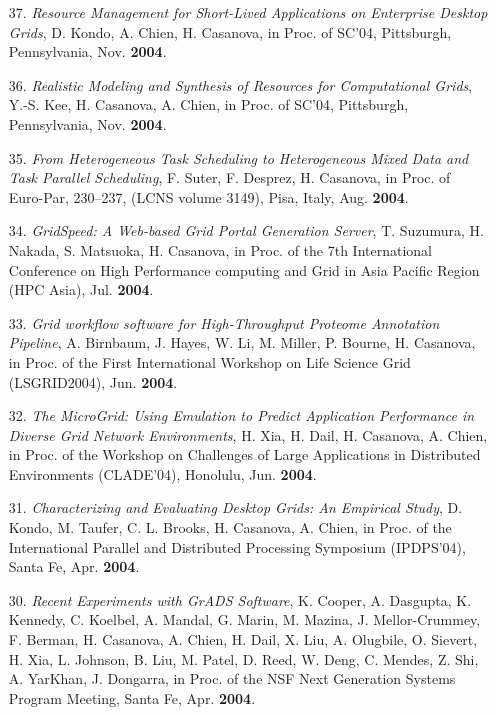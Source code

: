 \begin{enumerate}
\item [37.] {\it Resource Management for Short-Lived Applications on
Enterprise Desktop Grids}, D. Kondo, A. Chien, H. Casanova, in Proc.
of SC'04, Pittsburgh, Pennsylvania, Nov. {\bf 2004}.

\item [36.] {\it Realistic Modeling and Synthesis of Resources for
Computational Grids}, Y.-S. Kee, H. Casanova, A. Chien, in Proc. of
SC'04, Pittsburgh, Pennsylvania, Nov. {\bf 2004}.

\item [35.]
{\it From Heterogeneous Task Scheduling to Heterogeneous Mixed Data and
Task Parallel Scheduling}, F. Suter, F. Desprez, H. Casanova, in
Proc. of Euro-Par, 230--237, (LCNS volume 3149), Pisa, Italy, Aug. {\bf 2004}.

\item [34.]  {\it GridSpeed: A Web-based Grid Portal Generation Server}, T.
Suzumura, H. Nakada, S. Matsuoka, H. Casanova, in Proc. of the 7th
International Conference on High Performance computing and Grid in Asia
Pacific Region (HPC Asia), Jul. {\bf 2004}.

\item [33.]
{\it Grid workflow software for High-Throughput Proteome Annotation
Pipeline}, A. Birnbaum, J. Hayes, W. Li, M. Miller, P. Bourne,
H. Casanova, in Proc. of the First International Workshop
on Life Science Grid (LSGRID2004), Jun. {\bf 2004}.

\item [32.]
{\it The MicroGrid: Using Emulation to Predict Application Performance
in Diverse Grid Network Environments}, H. Xia, H. Dail, H. Casanova,
A. Chien, in Proc. of the Workshop on Challenges of Large Applications
in Distributed Environments (CLADE'04), Honolulu, Jun. {\bf 2004}.

\item [31.]
{\it Characterizing and Evaluating Desktop Grids: An Empirical Study},
D. Kondo, M. Taufer, C. L. Brooks, H. Casanova, A. Chien, in Proc.
of the International Parallel and Distributed Processing Symposium
(IPDPS'04), Santa Fe, Apr. {\bf 2004}.

\item [30.]
{\it Recent Experiments with GrADS Software}, K. Cooper, A. Dasgupta,
K. Kennedy, C. Koelbel, A. Mandal, G. Marin, M. Mazina, J. Mellor-Crummey,
F. Berman, H. Casanova, A. Chien, H. Dail, X. Liu, A. Olugbile,
O. Sievert, H. Xia, L. Johnson, B. Liu, M. Patel, D. Reed, W. Deng,
C. Mendes, Z. Shi, A. YarKhan, J. Dongarra, in Proc. of the NSF
Next Generation Systems Program Meeting, Santa Fe, Apr. {\bf 2004}.


\end{enumerate}
